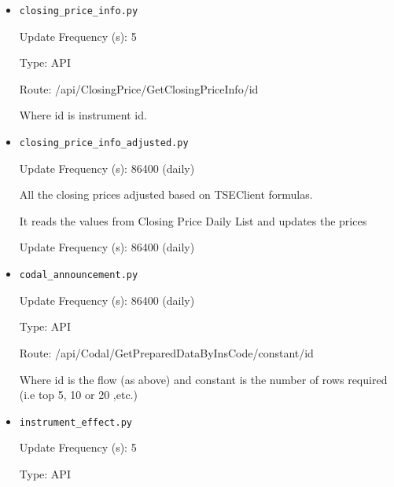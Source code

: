 {\begin{itemize}
      	Update Frequency (s): 86400 (daily)

      	Type: API

      	Route: /api/ClosingPrice/GetClosingPriceDailyList/id/constant

      	Where id is the flow (as above) and constant is the number of rows required (i.e top 5, 10 or 20 ,etc.)


      	\item \texttt{closing\_price\_info.py}

		Update Frequency (s): 5

		Type: API

		Route: /api/ClosingPrice/GetClosingPriceInfo/{id}

		Where id is instrument id.


      	\item \texttt{closing\_price\_info\_adjusted.py}

      	Update Frequency (s): 86400 (daily)

      	All the closing prices adjusted based on TSEClient formulas.

      	It reads the values from Closing Price Daily List and updates the prices

      	Update Frequency (s): 86400 (daily)

      	\item \texttt{codal\_announcement.py}

      	Update Frequency (s): 86400 (daily)

      	Type: API

      	Route: /api/Codal/GetPreparedDataByInsCode/constant/id

      	Where id is the flow (as above) and constant is the number of rows required (i.e top 5, 10 or 20 ,etc.)




      	\item \texttt{instrument\_effect.py}

   		Update Frequency (s): 5

	  	Type: API


\end{itemize}}
